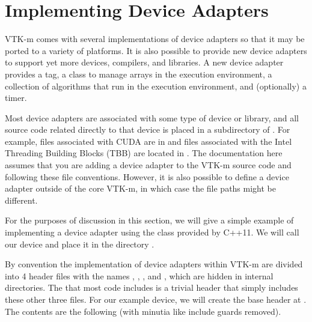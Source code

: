 
\chapter{Implementing Device Adapters}
\label{chap:ImplementingDeviceAdapters}


VTK-m comes with several implementations of device adapters so that it may
be ported to a variety of platforms. It is also possible to provide new
device adapters to support yet more devices, compilers, and libraries. A
new device adapter provides a tag, a class to manage arrays in the
execution environment, a collection of algorithms that run in the execution
environment, and (optionally) a timer.

Most device adapters are associated with some type of device or library,
and all source code related directly to that device is placed in a
subdirectory of . For example, files associated
with CUDA are in  and files associated with
the Intel Threading Building Blocks (TBB) are located in
. The documentation here assumes that you are
adding a device adapter to the VTK-m source code and following these file
conventions. However, it is also possible to define a device adapter
outside of the core VTK-m, in which case the file paths might be different.

For the purposes of discussion in this section, we will give a simple
example of implementing a device adapter using the 
class provided by C++11. We will call our device  and
place it in the directory .

By convention the implementation of device adapters within VTK-m are divided into 4 header files with the names , , , and , which are hidden in internal directories.
The  that most code includes is a trivial header that simply includes these other three files.
For our example  device, we will create the base header at .
The contents are the following (with minutia like include guards removed).

